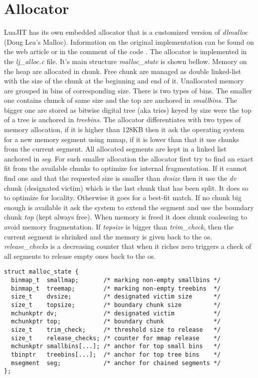 \section{Allocator}
\label{Sec:alloc}
LuaJIT has its own embedded allocator that is a customized version of \emph{dlmalloc}
(Doug Lea's Malloc). Information on the original implementation can be found on
the web article \cite{dlmalloc-art} or in the comment of the code
\cite{dlmalloc-impl}. The allocator is implemented in the \emph{lj\_alloc.c}
file. It's main structure \emph{malloc\_state} is shown bellow. Memory on the
heap are allocated in chunk. Free chunk are managed as double linked-list with
the size of the chunk at the beginning and end of it. Unallocated memory are
grouped in bins of corresponding size. There is two types of bins. The
smaller one contains chunck of same size and the top are anchored in
\emph{smallbins}. The bigger one are stored as bitwise digital tree (aka tries)
keyed by size were the top of a tree is anchored in \emph{treebins}. The
allocator differentiates with two types of memory allocation, if it is higher than
128KB then it ask the operating system for a new memory segment using mmap, if
it is lower than that it use chunks from the current segment. All allocated
segments are kept in a linked list anchored in \emph{seg}. For such smaller
allocation the allocator first try to find an exact fit from the available
chunks to optimize for internal fragmentation. If it cannot find one and that
the requested size is smaller than \emph{dvsize} then it use the \emph{dv}
chunk (designated victim) which is the last chunk that has been split. It does
so to optimize for locality. Otherwise it goes for a best-fit match. If no chunk
big enough is available it ask the system to extend the segment and use the
boundary chunk \emph{top} (kept always free). When memory is freed it does chunk
coalescing to avoid memory fragmentation. If \emph{topsize} is bigger than
\emph{trim\_check}, then the current segment is shrinked and the memory is given
back to the os. \emph{release\_checks} is a decreasing counter that when it
riches zero triggers a check of all segments to release empty ones back to the os.

\begin{lstlisting}[style=CStyle]
struct malloc_state {
  binmap_t  smallmap;       /* marking non-empty smallbins */
  binmap_t  treemap;        /* marking non-empty treebins  */
  size_t    dvsize;         /* designated victim size      */
  size_t    topsize;        /* boundary chunk size         */
  mchunkptr dv;             /* designated victim           */
  mchunkptr top;            /* boundary chunk              */
  size_t    trim_check;     /* threshold size to release   */
  size_t    release_checks; /* counter for mmap release    */
  mchunkptr smallbins[...]; /* anchor for top small bins   */
  tbinptr   treebins[...];  /* anchor for top tree bins    */
  msegment  seg;            /* anchor for chained segments */
};
\end{lstlisting}

